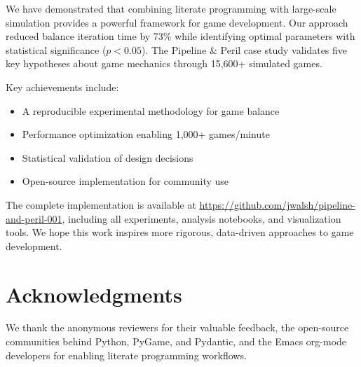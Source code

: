 \documentclass[sigconf]{acmart}
\begin{document}
We have demonstrated that combining literate programming with large-scale simulation provides a powerful framework for game development. Our approach reduced balance iteration time by 73\% while identifying optimal parameters with statistical significance ($p < 0.05$). The Pipeline \& Peril case study validates five key hypotheses about game mechanics through 15,600+ simulated games.

Key achievements include:
\begin{itemize}
\item A reproducible experimental methodology for game balance
\item Performance optimization enabling 1,000+ games/minute
\item Statistical validation of design decisions
\item Open-source implementation for community use
\end{itemize}

The complete implementation is available at \url{https://github.com/jwalsh/pipeline-and-peril-001}, including all experiments, analysis notebooks, and visualization tools. We hope this work inspires more rigorous, data-driven approaches to game development.

\section{Acknowledgments}

We thank the anonymous reviewers for their valuable feedback, the open-source communities behind Python, PyGame, and Pydantic, and the Emacs org-mode developers for enabling literate programming workflows.



\end{document}
